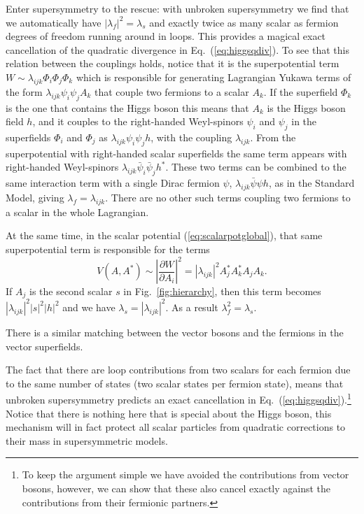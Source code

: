 \documentclass[notes.tex]{subfiles}
\begin{document}
Enter supersymmetry to the rescue: with unbroken supersymmetry we find that we automatically have $|\lambda_f|^2 = \lambda_s$ and exactly twice as many scalar as fermion degrees of freedom running around in loops. This provides a magical exact cancellation of the quadratic divergence in Eq.~(\ref{eq:higgsqdiv}). To see that this relation between the couplings holds, notice that it is the superpotential term $W \sim \lambda_{ijk}\Phi_i\Phi_j \Phi_k$ which is responsible for generating Lagrangian Yukawa terms of the form $\lambda_{ijk} \psi_i\psi_j A_k$ that couple two fermions to a scalar $A_k$. If the superfield $\Phi_k$ is the one that contains the Higgs boson this means that $A_k$ is the Higgs boson field $h$, and it couples to the right-handed Weyl-spinors $\psi_i$ and $\psi_j$  in the superfields $\Phi_i$ and $\Phi_j$  as $\lambda_{ijk}\psi_i\psi_j h$, with the coupling $\lambda_{ijk}$. From the superpotential with right-handed scalar superfields the same term appears with right-handed Weyl-spinors $\lambda_{ijk}\bar\psi_i\bar\psi_j h^*$. These two terms can be combined to the same interaction term with a single Dirac fermion $\psi$,  $\lambda_{ijk}\bar\psi\psi h$, as in the Standard Model, giving $\lambda_f = \lambda_{ijk}$. There are no other such terms coupling two fermions to a scalar in the whole Lagrangian.

At the same time, in the scalar potential (\ref{eq:scalarpotglobal}), that same superpotential term is responsible for the terms
\begin{equation}
V(A,A^*) \sim \left|\frac{\partial W}{\partial A_i}\right|^2 = |\lambda_{ijk}|^2A^*_jA^*_kA_jA_k.
\end{equation}
If $A_j$ is the second scalar $s$ in Fig.~\ref{fig:hierarchy}, then this term becomes $|\lambda_{ijk}|^2|s|^2|h|^2$ and we have $\lambda_s=|\lambda_{ijk}|^2$. As a result $\lambda_f^2=\lambda_s$.

There is a similar matching between the vector bosons and the fermions in the vector superfields.

The fact that there are loop contributions from two scalars for each fermion due to the same number of states (two scalar states per fermion state), means that unbroken supersymmetry predicts an exact cancellation in Eq.~(\ref{eq:higgsqdiv}).\footnote{To keep the argument simple we have avoided the contributions from vector bosons, however, we can show that these also cancel exactly against the contributions from their fermionic partners.} Notice that there is nothing here that is special about the Higgs boson, this mechanism will in fact protect all scalar particles from quadratic corrections to their mass in supersymmetric models.
\end{document}
